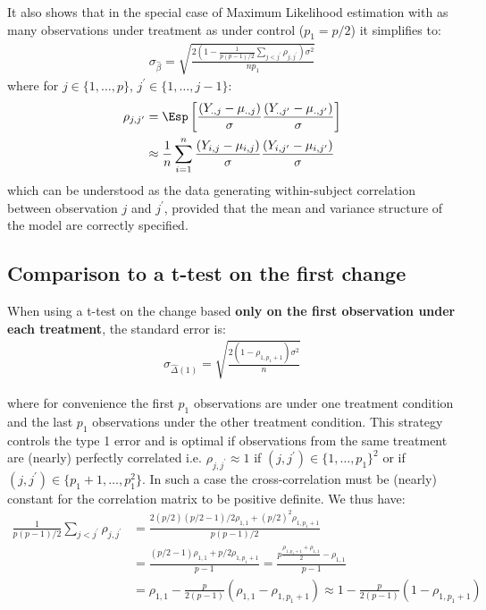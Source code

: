 \documentclass[12pt]{article}
\begin{document}
It also shows that in the special case of Maximum Likelihood
estimation with as many observations under treatment as under control
(\(p_1=p/2\)) it simplifies to:
\begin{align}
\sigma_{\widehat{\beta}} = \sqrt{\frac{2\left(1-\frac{1}{p(p-1)/2}\sum_{j < j^{\prime}} \rho_{j,j^{\prime}}\right) \sigma^2}{n p_1}} \label{eq:seML}
\end{align}
where for \(j \in \{1,\ldots,p\}\), \(j^{\prime} \in
  \{1,\ldots,j-1\}\):
\begin{align*}
\rho_{j,j^{\prime}} &= \Esp\left[\frac{(Y_{.,j}-\mu_{.,j})}{\sigma}\frac{(Y_{.,j^{\prime}}-\mu_{.,j^{\prime}})}{\sigma}\right] \\
                  &\approx \frac{1}{n}\sum_{i=1}^n \frac{(Y_{i,j}-\mu_{i,j})}{\sigma}\frac{(Y_{i,j^{\prime}}-\mu_{i,j^{\prime}})}{\sigma}
\end{align*}
which can be understood as the data generating within-subject
correlation between observation \(j\) and \(j^{\prime}\), provided
that the mean and variance structure of the model are correctly specified. 

\subsection{Comparison to a t-test on the first change}
\label{sec:org7ecd184}

When using a t-test on the change based \textbf{only on the first observation
under each treatment}, the standard error is:
\begin{align*}
\sigma_{\widehat{\Delta}(1)} = \sqrt{\frac{2(1-\rho_{1,p_1+1}) \sigma^2}{n}}
\end{align*}

where for convenience the first \(p_1\) observations are under one
treatment condition and the last \(p_1\) observations under the other
treatment condition. This strategy controls the type 1 error and is
optimal if observations from the same treatment are (nearly) perfectly
correlated i.e. \(\rho_{j,j^{\prime}} \approx 1\) if
\((j,j^{\prime})\in \{1,\ldots,p_1\}^2\) or if \((j,j^{\prime})\in
\{p_1+1,\ldots,p_1^2\}\). In such a case the cross-correlation must be
(nearly) constant for the correlation matrix to be positive
definite. We thus have:
\begin{align*}
\frac{1}{p(p-1)/2}\sum_{j < j^{\prime}} \rho_{j,j^{\prime}} &= \frac{2(p/2)(p/2-1)/2 \rho_{1,1} +(p/2)^2 \rho_{1,p_1+1}}{p(p-1)/2} \\
&= \frac{(p/2-1)\rho_{1,1}+p/2 \rho_{1,p_1+1}}{p-1} = \frac{p\frac{\rho_{1,p_1+1}+\rho_{1,1}}{2} - \rho_{1,1}}{p-1} \\
&= \rho_{1,1} - \frac{p}{2(p-1)}(\rho_{1,1}-\rho_{1,p_1+1}) \approx 1 - \frac{p}{2(p-1)}(1-\rho_{1,p_1+1})
\end{align*}
\end{document}
